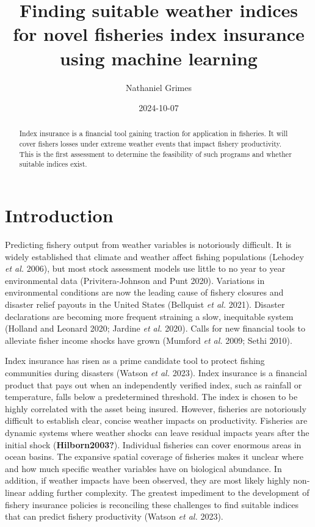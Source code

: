 \documentclass[
  letterpaper,
  DIV=11,
  numbers=noendperiod]{scrartcl}
\title{Finding suitable weather indices for novel fisheries index
insurance using machine learning}
\author{Nathaniel Grimes}
\date{2024-10-07}
\renewcommand*\contentsname{Table of contents}
\newcommand\contentsname{Table of contents}
\begin{document}
\maketitle
\begin{abstract}
Index insurance is a financial tool gaining traction for application in
fisheries. It will cover fishers losses under extreme weather events
that impact fishery productivity. This is the first assessment to
determine the feasibility of such programs and whether suitable indices
exist.
\end{abstract}
\ifdefined\Shaded\renewenvironment{Shaded}{\begin{tcolorbox}[sharp corners, borderline west={3pt}{0pt}{shadecolor}, boxrule=0pt, enhanced, interior hidden, frame hidden, breakable]}{\end{tcolorbox}}\fi

\renewcommand*\contentsname{Table of contents}
{
\hypersetup{linkcolor=}
\setcounter{tocdepth}{3}
\tableofcontents
}
\hypertarget{introduction}{%
\section{Introduction}\label{introduction}}

Predicting fishery output from weather variables is notoriously
difficult. It is widely established that climate and weather affect
fishing populations (Lehodey \emph{et al.} 2006), but most stock
assessment models use little to no year to year environmental data
(Privitera-Johnson and Punt 2020). Variations in environmental
conditions are now the leading cause of fishery closures and disaster
relief payouts in the United States (Bellquist \emph{et al.} 2021).
Disaster declarations are becoming more frequent straining a slow,
inequitable system (Holland and Leonard 2020; Jardine \emph{et al.}
2020). Calls for new financial tools to alleviate fisher income shocks
have grown (Mumford \emph{et al.} 2009; Sethi 2010).

Index insurance has risen as a prime candidate tool to protect fishing
communities during disasters (Watson \emph{et al.} 2023). Index
insurance is a financial product that pays out when an independently
verified index, such as rainfall or temperature, falls below a
predetermined threshold. The index is chosen to be highly correlated
with the asset being insured. However, fisheries are notoriously
difficult to establish clear, concise weather impacts on productivity.
Fisheries are dynamic systems where weather shocks can leave residual
impacts years after the initial shock (\textbf{Hilborn2003?}).
Individual fisheries can cover enormous areas in ocean basins. The
expansive spatial coverage of fisheries makes it unclear where and how
much specific weather variables have on biological abundance. In
addition, if weather impacts have been observed, they are most likely
highly non-linear adding further complexity. The greatest impediment to
the development of fishery insurance policies is reconciling these
challenges to find suitable indices that can predict fishery
productivity (Watson \emph{et al.} 2023).
\end{document}
